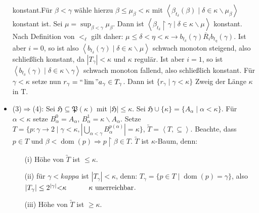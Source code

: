 \documentclass[a4paper,fontsize=11pt]{scrartcl}
\newcommand{\mathnode}[2]{%
  \mathord{\tikz[baseline=(#1.base), inner sep = 0pt]{\node (#1) {$#2$};}}}
\newcommand{\dom}{\operatorname{dom}}
\begin{document}
\begin{itemize}
      konstant.\newline Für $\beta<\gamma$ wähle hierzu
      $\beta\le\mu_\beta<\kappa$ mit $\left<\beta_{t_\delta}(\beta)\mid
      \delta\in\kappa\backslash\mu_\beta\right>$ konstant ist. Sei
      $\mu=\sup_{\beta<\gamma}\mu_\beta$. Dann ist
      $\left<\beta_{t_\delta}\upharpoonright\gamma\mid
      \delta\in\kappa\backslash\mu\right>$ konstant. Nach Definition
      von $<_\ell$ gilt daher: $\mu\le\delta<\eta<\kappa\rightarrow
      b_{t_\delta}(\gamma)\overline{R}_i b_{t_\eta}(\gamma)$. Ist aber
      $i=0$, so ist also
      $\left<b_{t_\delta}(\gamma)\mid\delta\in\kappa\backslash\mu\right>$
      schwach monoton steigend, also schließlich konstant, da
      $|T_\gamma|<\kappa$ und $\kappa$ regulär. Ist aber $i=1$, so ist
      $\left<b_{t_\delta}(\gamma)\mid\delta\in\kappa\backslash\gamma\right>$
      schwach monoton fallend, also schließlich konstant. Für
      $\gamma<\kappa$ setze nun
      $r_\gamma=\mbox{``}\lim\mbox{\textquotedblright} a_\gamma \in
      T_\gamma$. Dann ist $\{r_\gamma\mid\gamma<\kappa\}$ Zweig der Länge
      $\kappa$ in T.
    \item (3)$\Rightarrow$(4): Sei
      $\mathfrak{H}\subseteq\mathfrak{P}(\kappa)$ mit
      $|\mathfrak{H}|\le\kappa$. Sei
      $\mathfrak{H}\cup\{\kappa\}=\{A_\alpha\mid\alpha<\kappa\}$. Für
      $\alpha<\kappa$ setze $B_\alpha^0=A_\alpha$,
      $B_\alpha^1=\kappa\backslash A_\alpha$. Setze
      $T=\{p:\gamma\rightarrow 2\mid\gamma<\kappa,
      |\bigcup\limits_{\alpha<\gamma}B_\alpha^{p(\alpha)}|=\kappa\}$,
      $\utilde{T}=\left<T,\subseteq\right>$. Beachte, dass $p\in
      T\mbox{ und }\beta<\dom(p)\Rightarrow p\upharpoonright\beta\in
      T$. $\utilde{T}$ ist $\kappa$-Baum, denn:
      \begin{itemize}
      \item[(i)] Höhe von $\utilde{T}$ ist $\le\kappa$.
      \item[(ii)] für $\gamma<kappa$ ist $|T_\gamma|<\kappa$, denn:
        \vspace{20pt}$T_\gamma=\{p\in T\mid\dom(p)=\gamma\}$, also $|T_\gamma|\le
        2^{|\gamma|}\mathnode{l1}{<}\kappa \mathnode{l2}{{\phantom{aaa\mbox{daa}}\kappa\mbox{ unerreichbar}}}$.
        \item[(iii)] Höhe von $\utilde{T}$ ist $\ge\kappa$.

\end{itemize}
\end{itemize}
\end{document}
